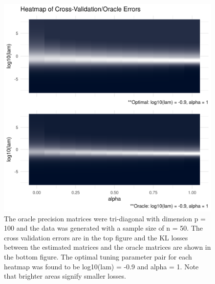 \documentclass[11pt,]{report}
\theoremstyle{definition}
\theoremstyle{definition}
\theoremstyle{definition}
\theoremstyle{remark}
\begin{document}
\begin{figure}

{\centering \includegraphics[width=0.85\linewidth,]{images/repsKLtridiag_N50_P100} 

}

\caption{The oracle precision matrices were tri-diagonal with dimension p = 100 and the data was generated with a sample size of n = 50. The cross validation errors are in the top figure and the KL losses between the estimated matrices and the oracle matrices are shown in the bottom figure. The optimal tuning parameter pair for each heatmap was found to be log10(lam) = -0.9 and alpha = 1. Note that brighter areas signify smaller losses.}\label{fig:admmsim5}
\end{figure}
\end{document}

